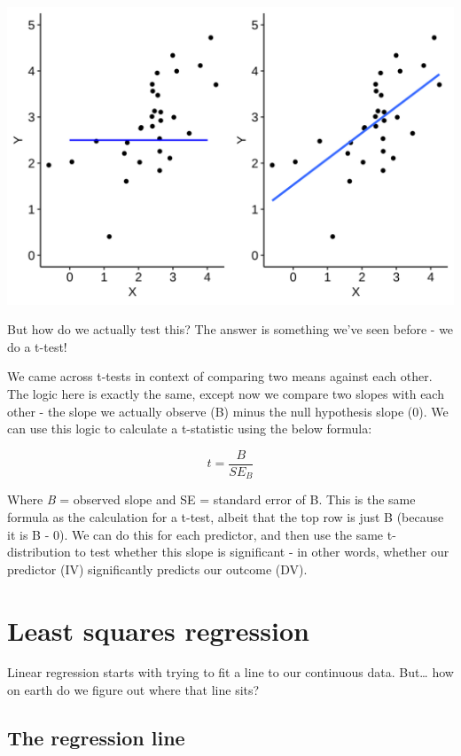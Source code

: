 \documentclass[
]{book}
\begin{document}
\begin{center}\includegraphics{img/w10_regression_hypotheses} \end{center}

But how do we actually test this? The answer is something we've seen before - we do a t-test!

We came across t-tests in context of comparing two means against each other. The logic here is exactly the same, except now we compare two slopes with each other - the slope we actually observe (B) minus the null hypothesis slope (0). We can use this logic to calculate a t-statistic using the below formula:

\[
t = \frac{B}{SE_B}
\]

Where \emph{B} = observed slope and SE = standard error of B. This is the same formula as the calculation for a t-test, albeit that the top row is just B (because it is B - 0). We can do this for each predictor, and then use the same t-distribution to test whether this slope is significant - in other words, whether our predictor (IV) significantly predicts our outcome (DV).

\section{Least squares regression}\label{least-squares-regression}

Linear regression starts with trying to fit a line to our continuous data. But\ldots{} how on earth do we figure out where that line sits?

\subsection{The regression line}\label{the-regression-line}
\end{document}
